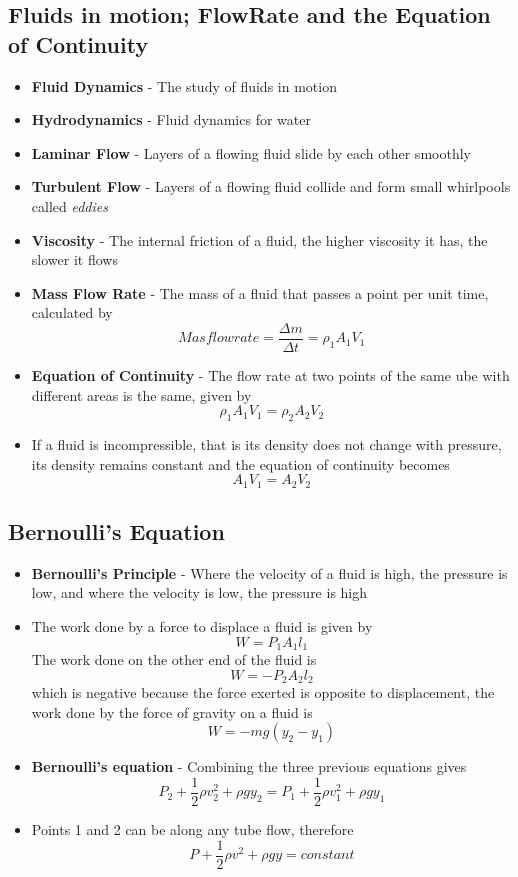 \subsection{Fluids in motion; FlowRate and the Equation of Continuity}
\begin{itemize}
    \item \textbf{Fluid Dynamics} - The study of fluids in motion
    \item \textbf{Hydrodynamics} - Fluid dynamics for water
    \item \textbf{Laminar Flow} - Layers of a flowing fluid slide by each other smoothly
    \item \textbf{Turbulent Flow} - Layers of a flowing fluid collide and form small whirlpools called \emph{eddies}
    \item \textbf{Viscosity} - The internal friction of a fluid, the higher viscosity it has, the slower it flows
    \item\textbf{Mass Flow Rate} - The mass of a fluid that passes a point per unit time, calculated by \[Mas flow rate = \frac{\Delta m}{\Delta t}=\rho_1A_1V_1\]
    \item\textbf{Equation of Continuity} - The flow rate at two points of the same ube with different areas is the same, given by \[\rho_1A_1V_1=\rho_2A_2V_2\]
    \item If a fluid is incompressible, that is its density does not change with pressure, its density remains constant and the equation of continuity becomes \[A_1V_1=A_2V_2\]
\end{itemize}

\subsection{Bernoulli’s Equation}
\begin{itemize}
    \item \textbf{Bernoulli's Principle} - Where the velocity of a fluid is high, the pressure is low, and where the velocity is low, the pressure is high
    \item The work done by a force to displace a fluid is given by \[W=P_1A_1l_1\] The work done on the other end of the fluid is \[W=-P_2A_2l_2\] which is negative because the force exerted is opposite to displacement, the work done by the force of gravity on a fluid is \[W=-mg(y_2-y_1)\]
    \item \textbf{Bernoulli's equation} - Combining the three previous equations gives \[P_2+\frac{1}{2}\rho v^2_2+\rho gy_2=P_1+\frac{1}{2}\rho v^2_1+\rho gy_1\] 
    \item Points 1 and 2 can be along any tube flow, therefore \[P+\frac{1}{2}\rho v^2+\rho gy=constant\]
\end{itemize}

